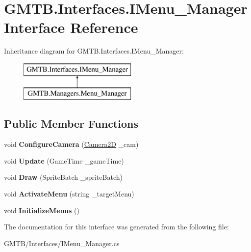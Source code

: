 \hypertarget{interface_g_m_t_b_1_1_interfaces_1_1_i_menu___manager}{}\section{G\+M\+T\+B.\+Interfaces.\+I\+Menu\+\_\+\+Manager Interface Reference}
\label{interface_g_m_t_b_1_1_interfaces_1_1_i_menu___manager}
Inheritance diagram for G\+M\+T\+B.\+Interfaces.\+I\+Menu\+\_\+\+Manager\+:\begin{figure}[H]
\begin{center}
\leavevmode
\includegraphics[height=2.000000cm]{interface_g_m_t_b_1_1_interfaces_1_1_i_menu___manager}
\end{center}
\end{figure}
\subsection*{Public Member Functions}
\begin{DoxyCompactItemize}
\item 
\mbox{\label{interface_g_m_t_b_1_1_interfaces_1_1_i_menu___manager_a0d3dcb753509e7b5aa8eff926db298a9}} 
void {\bfseries Configure\+Camera} (\mbox{\hyperlink{class_g_m_t_b_1_1_camera2_d}{Camera2D}} \+\_\+cam)
\item 
\mbox{\label{interface_g_m_t_b_1_1_interfaces_1_1_i_menu___manager_a17b1f6e2f9eb5a4cd244247997b04728}} 
void {\bfseries Update} (Game\+Time \+\_\+game\+Time)
\item 
\mbox{\label{interface_g_m_t_b_1_1_interfaces_1_1_i_menu___manager_ad79f2176368e398a15f9777c4fd49333}} 
void {\bfseries Draw} (Sprite\+Batch \+\_\+sprite\+Batch)
\item 
\mbox{\label{interface_g_m_t_b_1_1_interfaces_1_1_i_menu___manager_a25ac61a7a1f487757152d5332d74dea4}} 
void {\bfseries Activate\+Menu} (string \+\_\+target\+Menu)
\item 
\mbox{\label{interface_g_m_t_b_1_1_interfaces_1_1_i_menu___manager_ab906fa000a8f278611c500dfeea9d3fe}} 
void {\bfseries Initialize\+Menus} ()
\end{DoxyCompactItemize}


The documentation for this interface was generated from the following file\+:\begin{DoxyCompactItemize}
\item 
G\+M\+T\+B/\+Interfaces/I\+Menu\+\_\+\+Manager.\+cs\end{DoxyCompactItemize}
